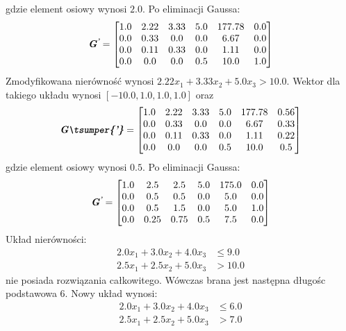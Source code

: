 gdzie element osiowy wynosi $2.0$. Po eliminacji Gaussa:
\begin{equation*}
  \textbf{\textit{G\textsuperscript{'}}} =
  \begin{bmatrix}
    1.0 & 2.22 & 3.33 & 5.0 & 177.78 & 0.0 \\
    0.0 & 0.33 & 0.0 & 0.0 & 6.67 & 0.0 \\
    0.0 & 0.11 & 0.33 & 0.0 & 1.11 & 0.0 \\
    0.0 & 0.0 & 0.0 & 0.5 & 10.0 & 1.0
  \end{bmatrix}
\end{equation*}
Zmodyfikowana nierówność wynosi $ 2.22 x_{1}+ 3.33 x_{2}+ 5.0 x_{3} > 10.0$. Wektor  dla takiego układu wynosi $[-10.0,1.0,1.0,1.0]$ oraz
\begin{equation*}
  \mf{G\tsumper{'}} =
  \begin{bmatrix}
    1.0 & 2.22 & 3.33 & 5.0 & 177.78 & 0.56 \\
    0.0 & 0.33 & 0.0 & 0.0 & 6.67 & 0.33 \\
    0.0 & 0.11 & 0.33 & 0.0 & 1.11 & 0.22 \\
    0.0 & 0.0 & 0.0 & 0.5 & 10.0 & 0.5
  \end{bmatrix}
\end{equation*}
gdzie element osiowy wynosi $0.5$. Po eliminacji Gaussa:
\begin{equation*}
  \textbf{\textit{G\textsuperscript{'}}} =
  \begin{bmatrix}
    1.0 & 2.5 & 2.5 & 5.0 & 175.0 & 0.0 \\
    0.0 & 0.5 & 0.5 & 0.0 & 5.0 & 0.0 \\
    0.0 & 0.5 & 1.5 & 0.0 & 5.0 & 1.0 \\
    0.0 & 0.25 & 0.75 & 0.5 & 7.5 & 0.0
  \end{bmatrix}
\end{equation*}
Układ nierówności:
\begin{equation*}
  \begin{aligned}
    2.0 x_{1}+ 3.0 x_{2}+ 4.0 x_{3} &\le 9.0 \\
    2.5 x_{1}+ 2.5 x_{2}+ 5.0 x_{3} &> 10.0
  \end{aligned}
\end{equation*}
nie posiada rozwiązania całkowitego. Wówczas brana jest następna długośc podstawowa 6. Nowy układ wynosi:
\begin{equation*}
  \begin{aligned}
    2.0 x_{1}+ 3.0 x_{2}+ 4.0 x_{3} &\le 6.0 \\
    2.5 x_{1}+ 2.5 x_{2}+ 5.0 x_{3} &> 7.0
  \end{aligned}
\end{equation*}
